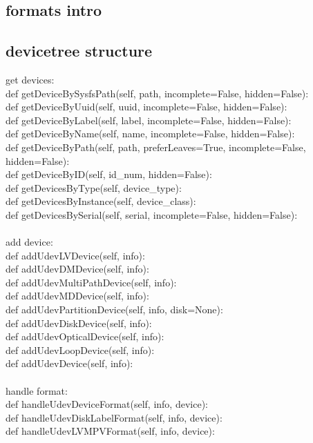 \documentclass{article}
\begin{document}
\subsection{formats intro}
\subsection{devicetree structure}
get devices:\\
    def getDeviceBySysfsPath(self, path, incomplete=False, hidden=False):\\
    def getDeviceByUuid(self, uuid, incomplete=False, hidden=False):\\
    def getDeviceByLabel(self, label, incomplete=False, hidden=False):\\
    def getDeviceByName(self, name, incomplete=False, hidden=False):\\
    def getDeviceByPath(self, path, preferLeaves=True, incomplete=False, hidden=False):\\
    def getDeviceByID(self, id\_num, hidden=False):\\
    def getDevicesByType(self, device\_type):\\
    def getDevicesByInstance(self, device\_class):\\
    def getDevicesBySerial(self, serial, incomplete=False, hidden=False):\\
\\
add device:\\
    def addUdevLVDevice(self, info):\\
    def addUdevDMDevice(self, info):\\
    def addUdevMultiPathDevice(self, info):\\
    def addUdevMDDevice(self, info):\\
    def addUdevPartitionDevice(self, info, disk=None):\\
    def addUdevDiskDevice(self, info):\\
    def addUdevOpticalDevice(self, info):\\
    def addUdevLoopDevice(self, info):\\
    def addUdevDevice(self, info):\\
\\
handle format:\\
    def handleUdevDeviceFormat(self, info, device):\\
    def handleUdevDiskLabelFormat(self, info, device):\\
    def handleUdevLVMPVFormat(self, info, device):\\
\end{document}
